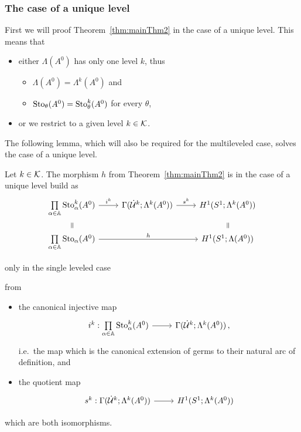 \subsubsection{The case of a unique level}
First we will proof Theorem~\ref{thm:mainThm2} in the case of a unique level.
This means that
\begin{itemize}
  \item either $\Lambda(A^0)$ has only one level $k$, thus
    \begin{itemize}
      \item $\Lambda(A^0)=\Lambda^k(A^0)$ and
      \item $\operatorname{Sto}_\theta(A^0)=\operatorname{Sto}_\theta^k(A^0)$ for every $\theta$,
    \end{itemize}
  \item or we restrict to a given level $k\in\mathcal{K}$.
\end{itemize}
The following lemma, which will also be required for the multileveled case,
solves the case of a unique level.
\begin{lem}
  Let $k\in\mathcal{K}$.
  The morphism $h$ from Theorem~\ref{thm:mainThm2} is in the case of a unique
  level build as
  \[ \begin{tikzcd}[row sep=0cm]
    \underset{\alpha\in\A}\prod\Sto_\alpha^k(A^0)
    \rar{i^k}
    & \Gamma(\dot\cU^k;\Lambda^k(A^0))
    \rar{s^k}
    & H^1(S^1;\Lambda^k(A^0))
    \\
    \text{\rotatebox[origin=c]{-90}{$=$}}
    \tikzmark{e1}
    &&
    \tikzmark{e2}
    \text{\rotatebox[origin=c]{-90}{$=$}}
    \\
    \underset{\alpha\in\A}\prod\Sto_\alpha(A^0)
    \arrow{rr}{h}
    && H^1(S^1;\Lambda(A^0))
  \end{tikzcd} \]
  \begin{flushright}
     only in the single leveled case
  \end{flushright}
  from
  \begin{itemize}
    \item the canonical injective map
      \[ \begin{tikzcd}
        i^k:\underset{\alpha\in\A}\prod\Sto_\alpha^k(A^0) \rar&
        \Gamma(\dot\cU^k;\Lambda^k(A^0)) \,,
      \end{tikzcd} \]
      i.e.\ the map which is the canonical extension of germs to their natural
      arc of definition, and
    \item the quotient map
      \[ \begin{tikzcd}
        s^k:\Gamma(\dot\cU^k;\Lambda^k(A^0)) \rar& H^1(S^1;\Lambda^k(A^0))
      \end{tikzcd} \]
  \end{itemize}
  which are both isomorphisms.
\end{lem}
